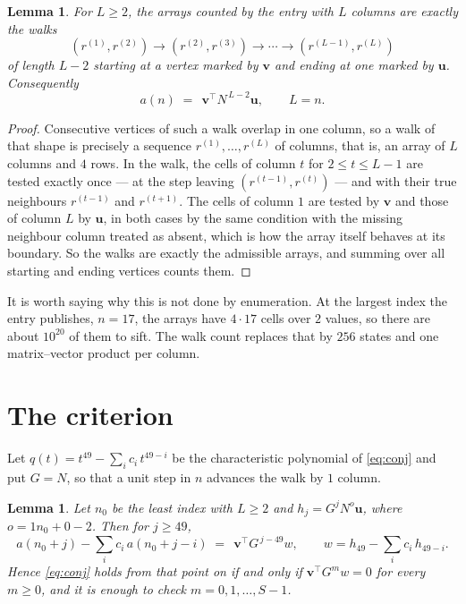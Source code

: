 \documentclass[11pt,a4paper]{article}
\theoremstyle{plain}
\newtheorem{lemma}[theorem]{Lemma}
\theoremstyle{definition}
\begin{document}
\begin{lemma}\label{lem:walk}
For $L\ge2$, the arrays counted by the entry with $L$ columns are exactly the walks
\[
(r^{(1)},r^{(2)})\to(r^{(2)},r^{(3)})\to\cdots\to(r^{(L-1)},r^{(L)})
\]
of length $L-2$ starting at a vertex marked by $\mathbf{v}$ and ending at one marked by
$\mathbf{u}$. Consequently
\[
a(n)\;=\;\,\mathbf{v}^{\!\top}N^{\,L-2}\mathbf{u},\qquad L=n .
\]
\end{lemma}

\begin{proof}
Consecutive vertices of such a walk overlap in one column, so a walk of that shape is
precisely a sequence $r^{(1)},\dots,r^{(L)}$ of columns, that is, an array of $L$ columns
and $4$ rows. In the walk, the cells of column $t$ for $2\le t\le L-1$ are tested
exactly once --- at the step leaving $(r^{(t-1)},r^{(t)})$ --- and with their true
neighbours $r^{(t-1)}$ and $r^{(t+1)}$. The cells of column $1$ are tested by
$\mathbf{v}$ and those of column $L$ by $\mathbf{u}$, in both cases by the same condition
with the missing neighbour column treated as absent, which is how the array itself behaves at
its boundary. So the walks are exactly the admissible arrays, and summing over all starting
and ending vertices counts them.
\end{proof}


It is worth saying why this is not done by enumeration. At the largest index the entry
publishes, $n=17$, the arrays have $4\cdot17$ cells over
$2$ values, so there are about $10^{20}$ of them to sift. The
walk count replaces that by $256$ states and one matrix--vector product per column.
\section{The criterion}

Let $q(t)=t^{49}-\sum_i c_i\,t^{49-i}$ be the characteristic polynomial of
\eqref{eq:conj} and put $G=N$, so that a unit step in $n$ advances the walk by
$1$ column.

\begin{lemma}\label{lem:crit}
Let $n_0$ be the least index with $L\ge2$ and $h_j=G^{j}N^{o}\mathbf{u}$, where
$o=1n_0+0-2$. Then for $j\ge49$,
\[
a(n_0+j)-\sum_i c_i\,a(n_0+j-i)\;=\;\,\mathbf{v}^{\!\top}G^{\,j-49}w,
\qquad w=h_{49}-\sum_i c_i\,h_{49-i} .
\]
Hence \eqref{eq:conj} holds from that point on if and only if
$\mathbf{v}^{\!\top}G^{m}w=0$ for every $m\ge0$, and it is enough to check
$m=0,1,\dots,S-1$.
\end{lemma}
\end{document}

